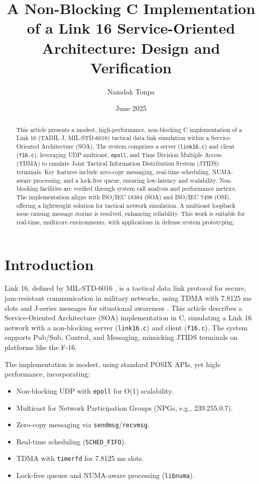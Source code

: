 \documentclass{article}
\title{A Non-Blocking C Implementation of a Link 16 Service-Oriented Architecture: Design and Verification}
\author{Namdak Tonpa}
\date{June 2025}
\begin{document}
\maketitle

\begin{abstract}
This article presents a modest, high-performance, non-blocking C implementation of a Link 16 (TADIL J, MIL-STD-6016) tactical data link simulation within a Service-Oriented Architecture (SOA). The system comprises a server (\texttt{link16.c}) and client (\texttt{f16.c}), leveraging UDP multicast, \texttt{epoll}, and Time Division Multiple Access (TDMA) to emulate Joint Tactical Information Distribution System (JTIDS) terminals. Key features include zero-copy messaging, real-time scheduling, NUMA-aware processing, and a lock-free queue, ensuring low-latency and scalability. Non-blocking facilities are verified through system call analysis and performance metrics. The implementation aligns with ISO/IEC 18384 (SOA) and ISO/IEC 7498 (OSI), offering a lightweight solution for tactical network simulation. A multicast loopback issue causing message storms is resolved, enhancing reliability. This work is suitable for real-time, multicore environments, with applications in defense system prototyping.
\end{abstract}

\tableofcontents

\section{Introduction}
Link 16, defined by MIL-STD-6016 \cite{milstd6016}, is a tactical data link protocol for secure, jam-resistant communication in military networks, using TDMA with 7.8125 ms slots and J-series messages for situational awareness \cite{ada404334}. This article describes a Service-Oriented Architecture (SOA) implementation in C, simulating a Link 16 network with a non-blocking server (\texttt{link16.c}) and client (\texttt{f16.c}). The system supports Pub/Sub, Control, and Messaging, mimicking JTIDS terminals on platforms like the F-16.

The implementation is modest, using standard POSIX APIs, yet high-performance, incorporating:
\begin{itemize}
    \item Non-blocking UDP with \texttt{epoll} for O(1) scalability.
    \item Multicast for Network Participation Groups (NPGs, e.g., 239.255.0.7).
    \item Zero-copy messaging via \texttt{sendmsg}/\texttt{recvmsg}.
    \item Real-time scheduling (\texttt{SCHED\_FIFO}).
    \item TDMA with \texttt{timerfd} for 7.8125 ms slots.
    \item Lock-free queues and NUMA-aware processing (\texttt{libnuma}).
\end{itemize}
\end{document}
